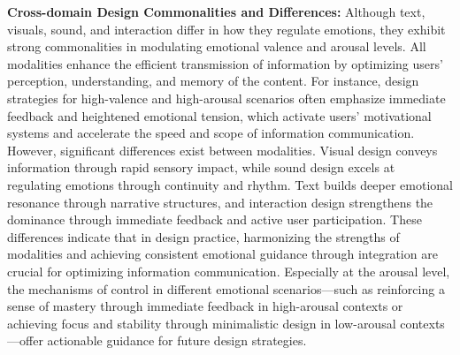 \textbf{Cross-domain Design Commonalities and Differences:} Although text, visuals, sound, and interaction differ in how they regulate emotions, they exhibit strong commonalities in modulating emotional valence and arousal levels. All modalities enhance the efficient transmission of information by optimizing users’ perception, understanding, and memory of the content. For instance, design strategies for high-valence and high-arousal scenarios often emphasize immediate feedback and heightened emotional tension, which activate users’ motivational systems and accelerate the speed and scope of information communication. However, significant differences exist between modalities. Visual design conveys information through rapid sensory impact, while sound design excels at regulating emotions through continuity and rhythm. Text builds deeper emotional resonance through narrative structures, and interaction design strengthens the dominance through immediate feedback and active user participation. These differences indicate that in design practice, harmonizing the strengths of modalities and achieving consistent emotional guidance through integration are crucial for optimizing information communication. Especially at the arousal level, the mechanisms of control in different emotional scenarios—such as reinforcing a sense of mastery through immediate feedback in high-arousal contexts or achieving focus and stability through minimalistic design in low-arousal contexts—offer actionable guidance for future design strategies.

